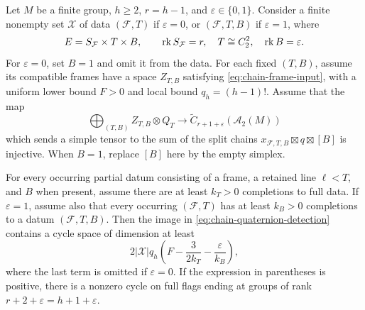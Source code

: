 \begin{lemma}\label{lem:quaternion-decoration}
Let $M$ be a finite group, $h\geq2$, $r=h-1$, and
$\varepsilon\in\{0,1\}$. Consider a finite nonempty set
$\mathcal X$ of data $(\mathcal F,T)$ if $\varepsilon=0$, or
$(\mathcal F,T,B)$ if $\varepsilon=1$, where
\[
 E=S_{\mathcal F}\times T\times B,
 \qquad \operatorname{rk} S_{\mathcal F}=r,\quad T\cong C_2^2,
 \quad \operatorname{rk} B=\varepsilon.
\]
For $\varepsilon=0$, set $B=1$ and omit it from the data.
For each fixed $(T,B)$, assume its compatible frames have a space
$Z_{T,B}$ satisfying \eqref{eq:chain-frame-input}, with a uniform
lower bound $F>0$ and local bound $q_h=(h-1)!$. Assume that the map
\begin{equation}\label{eq:chain-quaternion-detection}
 \bigoplus_{(T,B)} Z_{T,B}\otimes Q_T
 \longrightarrow \widetilde C_{r+1+\varepsilon}
                       (\mathcal A_2(M))
\end{equation}
which sends a simple tensor to the sum of the split chains
$x_{\mathcal F,T,B}\boxtimes q\boxtimes[B]$ is injective.
When $B=1$, replace $[B]$ here by the empty simplex.

For every occurring partial datum consisting of a frame, a
retained line $\ell<T$, and $B$ when present, assume there are
at least $k_T>0$ completions to full data. If $\varepsilon=1$,
assume also that every occurring $(\mathcal F,T)$ has at least
$k_B>0$ completions to a datum $(\mathcal F,T,B)$.
Then the image in \eqref{eq:chain-quaternion-detection} contains
a cycle space of dimension at least
\begin{equation}\label{eq:chain-quaternion-dimension}
 2|\mathcal X|q_h
 \left(F-\frac{3}{2k_T}-\frac{\varepsilon}{k_B}\right),
\end{equation}
where the last term is omitted if $\varepsilon=0$.
If the expression in parentheses is positive, there is a
nonzero cycle on full flags ending at groups of rank
$r+2+\varepsilon=h+1+\varepsilon$.
\end{lemma}

